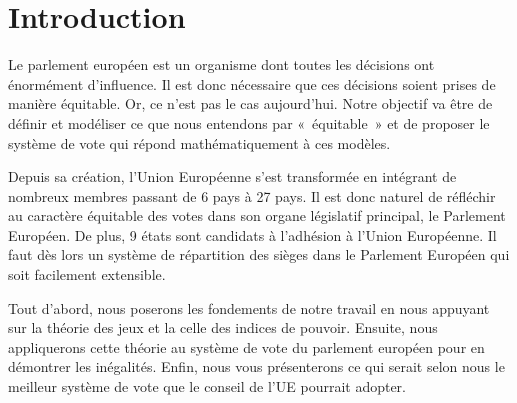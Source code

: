 

\section{Introduction}

Le parlement européen est un organisme dont toutes les décisions ont énormément d’influence. Il est donc nécessaire que ces décisions soient prises de manière équitable. Or, ce n’est pas le cas aujourd’hui. Notre objectif va être de définir et modéliser ce que nous entendons par « équitable » et de proposer le système de vote qui répond mathématiquement à ces modèles.

Depuis sa création, l’Union Européenne s’est transformée en intégrant de nombreux membres passant de 6 pays à 27 pays. Il est donc naturel de réfléchir au caractère équitable des votes dans son organe législatif principal, le Parlement Européen. De plus, 9 états sont candidats à l'adhésion à l'Union Européenne. Il faut dès lors un système de répartition des sièges dans le Parlement Européen qui soit facilement extensible.

Tout d’abord, nous poserons les fondements de notre travail en nous appuyant sur la théorie des jeux et la celle des indices de pouvoir. Ensuite, nous appliquerons cette théorie au système de vote du parlement européen pour en démontrer les inégalités. Enfin, nous vous présenterons ce qui serait selon nous le meilleur système de vote que le conseil de l’UE pourrait adopter.